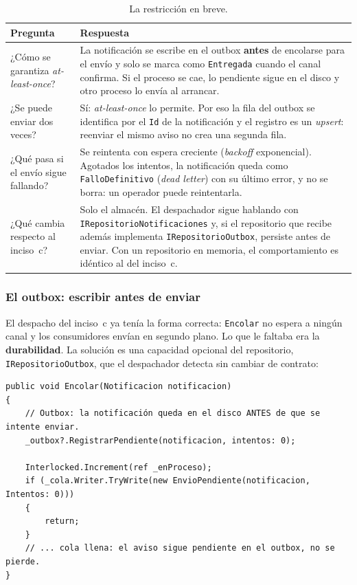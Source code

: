 \begin{table}[H]
\centering
\small
\begin{tabularx}{\textwidth}{>{\raggedright\arraybackslash}p{5cm} >{\raggedright\arraybackslash}X}
\toprule
\textbf{Pregunta} & \textbf{Respuesta} \\
\midrule
¿Cómo se garantiza \emph{at-least-once}? &
La notificación se escribe en el outbox \textbf{antes} de encolarse para el envío y solo se
marca como \texttt{Entregada} cuando el canal confirma. Si el proceso se cae, lo pendiente sigue
en el disco y otro proceso lo envía al arrancar. \\
\addlinespace
¿Se puede enviar dos veces? &
Sí: \emph{at-least-once} lo permite. Por eso la fila del outbox se identifica por el
\texttt{Id} de la notificación y el registro es un \emph{upsert}: reenviar el mismo aviso no
crea una segunda fila. \\
\addlinespace
¿Qué pasa si el envío sigue fallando? &
Se reintenta con espera creciente (\emph{backoff} exponencial). Agotados los intentos, la
notificación queda como \texttt{FalloDefinitivo} (\emph{dead letter}) con su último error, y no
se borra: un operador puede reintentarla. \\
\addlinespace
¿Qué cambia respecto al inciso~c? &
Solo el almacén. El despachador sigue hablando con \texttt{IRepositorioNotificaciones} y, si el
repositorio que recibe además implementa \texttt{IRepositorioOutbox}, persiste antes de enviar.
Con un repositorio en memoria, el comportamiento es idéntico al del inciso~c. \\
\bottomrule
\end{tabularx}
\caption{La restricción en breve.}
\end{table}

\subsubsection{El outbox: escribir antes de enviar}

El despacho del inciso~c ya tenía la forma correcta: \texttt{Encolar} no espera a ningún canal y
los consumidores envían en segundo plano. Lo que le faltaba era la \textbf{durabilidad}. La
solución es una capacidad opcional del repositorio, \texttt{IRepositorioOutbox}, que el
despachador detecta sin cambiar de contrato:

\begin{lstlisting}[basicstyle=\ttfamily\footnotesize, columns=fullflexible, keepspaces=true, caption={El despachador persiste antes de encolar (solo si el repositorio sabe hacerlo).}]
public void Encolar(Notificacion notificacion)
{
    // Outbox: la notificación queda en el disco ANTES de que se intente enviar.
    _outbox?.RegistrarPendiente(notificacion, intentos: 0);

    Interlocked.Increment(ref _enProceso);
    if (_cola.Writer.TryWrite(new EnvioPendiente(notificacion, Intentos: 0)))
    {
        return;
    }
    // ... cola llena: el aviso sigue pendiente en el outbox, no se pierde.
}
\end{lstlisting}

